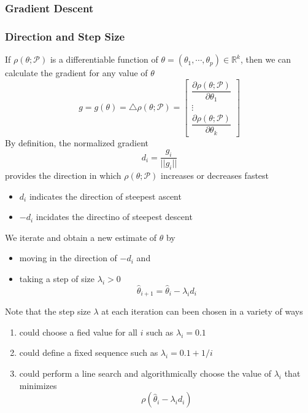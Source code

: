 \documentclass[11pt]{article}
\newcommand{\R}{{\mathbb{R}}}
\newcommand{\cv}[1]{\begin{bmatrix} #1 \end{bmatrix}}
\newcommand{\tri}{\triangle}
\begin{document}
\subsubsection{Gradient Descent}
\subsubsection*{Direction and Step Size}
If $\rho(\theta;\mathcal{P})$ is a differentiable function of $\theta = (\theta_1,\cdots,\theta_p)\in\R^k$, then we can calculate the gradient for any value of $\theta$
\[g = g(\theta) = \tri\rho(\theta;\mathcal{P}) = \cv{\dfrac{\partial \rho(\theta;\mathcal{P})}{\partial \theta_1}\\\vdots\\\dfrac{\partial \rho(\theta;\mathcal{P})}{\partial \theta_k}}\]
By definition, the normalized gradient \[d_i = \dfrac{g_i}{||g_i||}\]    
provides the direction in which $\rho(\theta;\mathcal{P})$ increases or decreases fastest 
\begin{itemize}
    \item $d_i$ indicates the direction of steepest ascent 
    \item $-d_i$ incidates the directino of steepest descent 
\end{itemize}
We iterate and obtain a new estimate of $\theta$ by 
\begin{itemize}
    \item moving in the direction of $-d_i$ and 
    \item taking a step of size $\lambda_i > 0$ \[\hat{\theta}_{i+1} = \hat{\theta}_i - \lambda_id_i\]    
\end{itemize}
Note that the step size $\lambda$ at each iteration can been chosen in a variety of ways 
\begin{enumerate}
    \item could choose a fied value for all $i$ such as $\lambda_i = 0.1$
    \item could define a fixed sequence such as $\lambda_i=0.1 + 1/i$
    \item could perform a line search and algorithmically choose the value of $\lambda_i$ that minimizes \[\rho(\hat{\theta}_i - \lambda_id_i)\] 
\end{enumerate}
\end{document}
